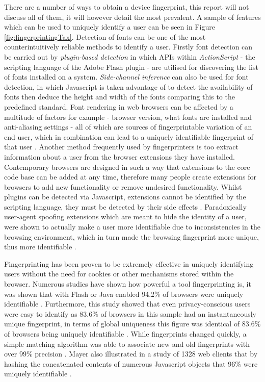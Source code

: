 \documentclass[12pt]{article}
\begin{document}
There are a number of ways to obtain a device fingerprint, this report will not discuss all of them, it will however detail the most prevalent. A sample of features which can be used to uniquely identify a user can be seen in Figure \ref{fig:fingerprintingTax}. Detection of fonts can be one of the most counterintuitively reliable methods to identify a user. Firstly font detection can be carried out by \textit{plugin-based detection} in which APIs within \textit{ActionScript} - the scripting language of the Adobe Flash plugin - are utilised for discovering the list of fonts installed on a system. \textit{Side-channel inference} can also be used for font detection, in which Javascript is taken advantage of to detect the availability of fonts then deduce the height and width of the fonts comparing this to the predefined standard. Font rendering in web browsers can be affected by a multitude of factors for example - browser version, what fonts are installed and anti-aliasing settings - all of which are sources of fingerprintable variation of an end user, which in combination can lead to a uniquely identifiable fingerprint of that user \parencite{fingerprintFonts}. Another method frequently used by fingerprinters is too extract information about a user from the browser extensions they have installed. Contemporary browsers are designed in such a way that extensions to the core code base can be added at any time, therefore many people create extensions for browsers to add new functionality or remove undesired functionality. Whilst plugins can be detected via Javascript, extensions cannot be identified by the scripting language, they must be detected by their side effects \parencite{dustingFP}. Paradoxically user-agent spoofing extensions which are meant to hide the identity of a user, were shown to actually make a user more identifiable due to inconsistencies in the browsing environment, which in turn made the browsing fingerprint more unique, thus more identifiable  \parencite{cookielessMonster}.

Fingerprinting has been proven to be extremely effective in uniquely identifying users without the need for cookies or other mechanisms stored within the browser. Numerous studies have shown how powerful a tool fingerprinting is, it was shown that with Flash or Java enabled 94.2\% of browsers were uniquely identifiable \parencite{uniqueBrowser}. Furthermore, this study showed that even privacy-conscious users were easy to identify as 83.6\% of browsers in this sample had an instantaneously unique fingerprint, in terms of global uniqueness this figure was identical of 83.6\% of browsers being uniquely identifiable \parencite{uniqueBrowser}. While fingerprints changed quickly, a simple matching algorithm was able to associate new and old fingerprints with over 99\% precision \parencite{uniqueBrowser}. Mayer also illustrated in a study of 1328 web clients that by hashing the concatenated contents of numerous Javascript objects that 96\% were uniquely identifiable \parencite{mayer09}. \\ 
\end{document}
